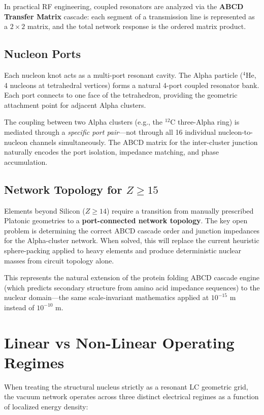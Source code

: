 In practical RF engineering, coupled resonators are analyzed via the \textbf{ABCD Transfer Matrix} cascade: each segment of a transmission line is represented as a $2\times 2$ matrix, and the total network response is the ordered matrix product.

\subsection{Nucleon Ports}
Each nucleon knot acts as a multi-port resonant cavity. The Alpha particle ($^4$He, 4 nucleons at tetrahedral vertices) forms a natural 4-port coupled resonator bank. Each port connects to one face of the tetrahedron, providing the geometric attachment point for adjacent Alpha clusters.

The coupling between two Alpha clusters (e.g., the $^{12}$C three-Alpha ring) is mediated through a \textit{specific port pair}---not through all 16 individual nucleon-to-nucleon channels simultaneously. The ABCD matrix for the inter-cluster junction naturally encodes the port isolation, impedance matching, and phase accumulation.

\subsection{Network Topology for $Z \geq 15$}
Elements beyond Silicon ($Z \geq 14$) require a transition from manually prescribed Platonic geometries to a \textbf{port-connected network topology}. The key open problem is determining the correct ABCD cascade order and junction impedances for the Alpha-cluster network. When solved, this will replace the current heuristic sphere-packing applied to heavy elements and produce deterministic nuclear masses from circuit topology alone.

This represents the natural extension of the protein folding ABCD cascade engine (which predicts secondary structure from amino acid impedance sequences) to the nuclear domain---the same scale-invariant mathematics applied at $10^{-15}$ m instead of $10^{-10}$ m.

\section{Linear vs Non-Linear Operating Regimes}
\label{sec:operating_regimes}
When treating the structural nucleus strictly as a resonant LC geometric grid, the vacuum network operates across three distinct electrical regimes as a function of localized energy density:

